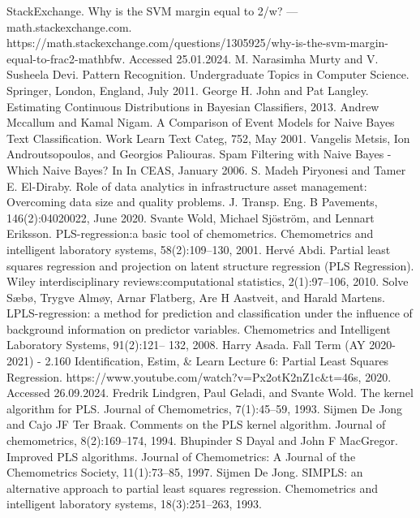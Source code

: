\documentclass[preprint,12pt]{elsarticle}
\begin{document}
\begin{thebibliography}{000}
 StackExchange. Why is the SVM margin equal to 2/w? — math.stackexchange.com. https://math.stackexchange.com/questions/1305925/why-is-the-svm-margin-equal-to-frac2-mathbfw. Accessed 25.01.2024. 
 M. Narasimha Murty and V. Susheela Devi. Pattern Recognition. Undergraduate Topics in Computer Science. Springer, London, England, July 2011. 
 George H. John and Pat Langley. Estimating Continuous Distributions in Bayesian Classifiers, 2013. 
 Andrew Mccallum and Kamal Nigam. A Comparison of Event Models for Naive Bayes Text Classification. Work Learn Text Categ, 752, May 2001. 
 Vangelis Metsis, Ion Androutsopoulos, and Georgios Paliouras. Spam Filtering with Naive Bayes - Which Naive Bayes? In In CEAS, January 2006. 
 S. Madeh Piryonesi and Tamer E. El-Diraby. Role of data analytics in infrastructure asset management: Overcoming data size and quality problems. J. Transp. Eng. B Pavements, 146(2):04020022, June 2020. 
 Svante Wold, Michael Sjöström, and Lennart Eriksson. PLS-regression:a basic tool of chemometrics. Chemometrics and intelligent laboratory systems, 58(2):109–130, 2001. 
 Hervé Abdi. Partial least squares regression and projection on latent structure regression (PLS Regression). Wiley interdisciplinary reviews:computational statistics, 2(1):97–106, 2010. 
 Solve Sæbø, Trygve Almøy, Arnar Flatberg, Are H Aastveit, and Harald Martens. LPLS-regression: a method for prediction and classification under the influence of background information on predictor variables. Chemometrics and Intelligent Laboratory Systems, 91(2):121– 132, 2008. 
 Harry Asada. Fall Term (AY 2020-2021) - 2.160 Identification, Estim, & Learn Lecture 6: Partial Least Squares Regression. https://www.youtube.com/watch?v=Px2otK2nZ1c&t=46s, 2020. Accessed 26.09.2024. 
 Fredrik Lindgren, Paul Geladi, and Svante Wold. The kernel algorithm for PLS. Journal of Chemometrics, 7(1):45–59, 1993. 
 Sijmen De Jong and Cajo JF Ter Braak. Comments on the PLS kernel algorithm. Journal of chemometrics, 8(2):169–174, 1994. 
 Bhupinder S Dayal and John F MacGregor. Improved PLS algorithms. Journal of Chemometrics: A Journal of the Chemometrics Society, 11(1):73–85, 1997. 
 Sijmen De Jong. SIMPLS: an alternative approach to partial least squares regression. Chemometrics and intelligent laboratory systems, 18(3):251–263, 1993. 

\end{thebibliography}
\end{document}
